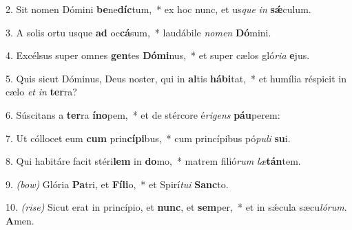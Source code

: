 2. Sit nomen Dómini \textbf{be}ne\textbf{díc}tum,~* ex hoc nunc, et us\textit{que} \textit{in} \textbf{sǽ}culum.

3. A solis ortu usque \textbf{ad} oc\textbf{cá}sum,~* laudábile \textit{no}\textit{men} \textbf{Dó}mini.

4. Excélsus super omnes \textbf{gen}tes \textbf{Dó}\textbf{mi}nus,~* et super cælos gló\textit{ri}\textit{a} \textbf{e}jus.

5. Quis sicut Dóminus, Deus noster, qui in \textbf{al}tis \textbf{há}\textbf{bi}tat,~* et humília réspicit in cælo \textit{et} \textit{in} \textbf{ter}ra?

6. Súscitans a \textbf{ter}ra \textbf{ín}\textbf{o}pem,~* et de stércore é\textit{ri}\textit{gens} \textbf{páu}perem:

7. Ut cóllocet eum \textbf{cum} prin\textbf{cí}\textbf{pi}bus,~* cum princípibus pó\textit{pu}\textit{li} \textbf{su}i.

8. Qui habitáre facit stéri\textbf{lem} in \textbf{do}mo,~* matrem filió\textit{rum} \textit{læ}\textbf{tán}tem.

9. \textit{(bow)} Glória \textbf{Pa}tri, et \textbf{Fí}\textbf{li}o,~* et Spirí\textit{tu}\textit{i} \textbf{Sanc}to.

10. \textit{(rise)} Sicut erat in princípio, et \textbf{nunc}, et \textbf{sem}per,~* et in sǽcula sæcu\textit{ló}\textit{rum}. \textbf{A}men.